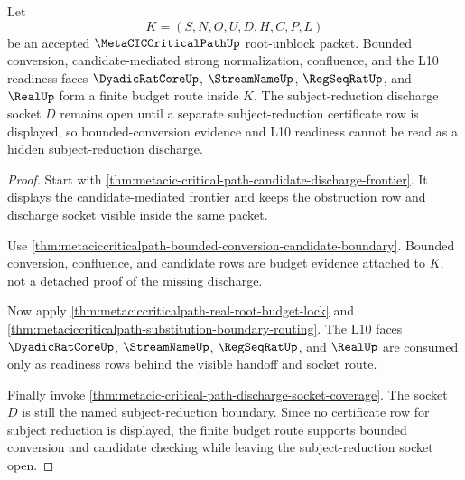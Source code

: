 \begin{theorem}
\label{thm:metacic-critical-path-candidate-discharge-budget-route}
Let
$$
K=(S,N,O,U,D,H,C,P,L)
$$
be an accepted $\MetaCICCriticalPathUp$ root-unblock packet. Bounded conversion, candidate-mediated strong normalization, confluence, and the L10 readiness faces $\DyadicRatCoreUp$, $\StreamNameUp$, $\RegSeqRatUp$, and $\RealUp$ form a finite budget route inside $K$. The subject-reduction discharge socket $D$ remains open until a separate subject-reduction certificate row is displayed, so bounded-conversion evidence and L10 readiness cannot be read as a hidden subject-reduction discharge.
\end{theorem}
\begin{proof}
Start with \autoref{thm:metacic-critical-path-candidate-discharge-frontier}. It displays the candidate-mediated frontier and keeps the obstruction row and discharge socket visible inside the same packet.

Use \autoref{thm:metaciccriticalpath-bounded-conversion-candidate-boundary}. Bounded conversion, confluence, and candidate rows are budget evidence attached to $K$, not a detached proof of the missing discharge.

Now apply \autoref{thm:metaciccriticalpath-real-root-budget-lock} and \autoref{thm:metaciccriticalpath-substitution-boundary-routing}. The L10 faces $\DyadicRatCoreUp$, $\StreamNameUp$, $\RegSeqRatUp$, and $\RealUp$ are consumed only as readiness rows behind the visible handoff and socket route.

Finally invoke \autoref{thm:metacic-critical-path-discharge-socket-coverage}. The socket $D$ is still the named subject-reduction boundary. Since no certificate row for subject reduction is displayed, the finite budget route supports bounded conversion and candidate checking while leaving the subject-reduction socket open.
\end{proof}

